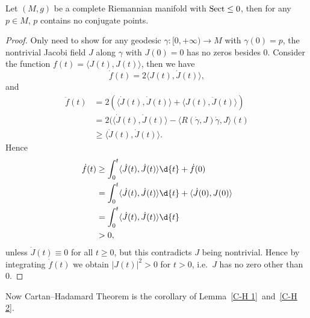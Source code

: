 \begin{lem}\label{C-H 2}
    Let $(M,g)$ be a complete Riemannian manifold with $\operatorname{Sect}\leq 0$, then for any $p\in M$, $p$ contains no conjugate points.
\end{lem}
\begin{proof}
    Only need to show for any geodesic $\gamma:[0,+\infty)\to M$ with $\gamma(0)=p$, the nontrivial Jacobi field $J$ along $\gamma$ with $J(0)=0$ has no zeros besides $0$.
    Consider the function $f(t)=\langle J(t),J(t)\rangle$, then we have
    \[\dot{f}(t)=2\langle J(t),\dot{J}(t)\rangle,\]
    and
    \begin{align*}
        \ddot{f}(t)&=2(\langle\dot{J}(t),\dot{J}(t)\rangle+\langle J(t),\ddot{J}(t)\rangle)\\
        &=2(\langle\dot{J}(t),\dot{J}(t)\rangle-\langle R(\dot\gamma,J)\dot\gamma,J\rangle(t)\\
        &\geq\langle\dot{J}(t),\dot{J}(t)\rangle.
    \end{align*}
    Hence
    \begin{align*}
        \dot{f}(t)&\geq\int_{0}^{t}\langle\dot{J}(t),\dot{J}(t)\rangle\d{t}+\dot{f}(0)\\
        &=\int_{0}^{t}\langle\dot{J}(t),\dot{J}(t)\rangle\d{t}+\langle\dot{J}(0),J(0)\rangle\\
        &=\int_{0}^{t}\langle\dot{J}(t),\dot{J}(t)\rangle\d{t}\\
        &>0,
    \end{align*}
    unless $\dot{J}(t)\equiv 0$ for all $t\geq 0$, but this contradicts $J$ being nontrivial.
    Hence by integrating $\dot{f}(t)$ we obtain $|J(t)|^2>0$ for $t>0$, i.e.\ $J$ has no zero other than $0$.
\end{proof}

Now Cartan--Hadamard Theorem is the corollary of Lemma~\ref{C-H 1}~and~\ref{C-H 2}.

